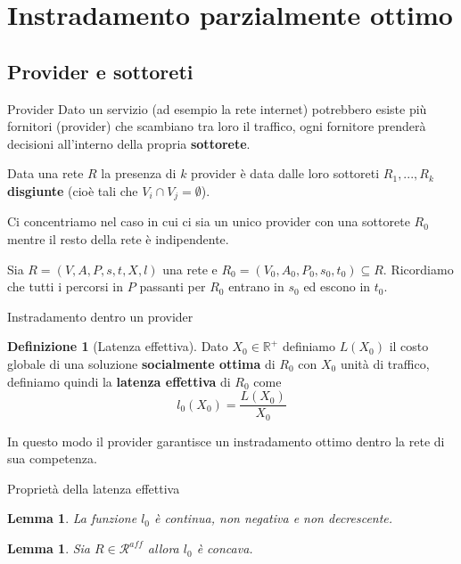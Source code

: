 \documentclass{beamer}
\newcounter{counter1}
\theoremstyle{plain}
\newtheorem{mylem}[counter1]{Lemma}
\theoremstyle{definition}
\newtheorem{mydef}[counter1]{Definizione}
\theoremstyle{remark}
\newcommand{\pa}[1]{\left(#1\right)}
\begin{document}
\section{Instradamento parzialmente ottimo}

\subsection{Provider e sottoreti}

\begin{frame}{Provider}
  Dato un servizio (ad esempio la rete internet) potrebbero esiste più
  fornitori (provider) che scambiano tra loro il traffico, ogni
  fornitore prenderà decisioni all'interno della propria
  \textbf{sottorete}.

  Data una rete $R$ la presenza di $k$ provider è data dalle loro
  sottoreti $R_1,...,R_k$ \textbf{disgiunte} (cioè tali che $V_i\cap
  V_j = \emptyset$). \vfill

  Ci concentriamo nel caso in cui ci sia un unico provider con una
  sottorete $R_0$ mentre il resto della rete è indipendente.

  Sia $R=(V,A,P,s,t,X,l)$ una rete e $R_0=(V_0,A_0,P_0,s_0,t_0)
  \subseteq R$. Ricordiamo che tutti i percorsi in $P$ passanti per
  $R_0$ entrano in $s_0$ ed escono in $t_0$.
  \vfill
\end{frame}

\begin{frame}{Instradamento dentro un provider}
  \begin{mydef}[Latenza effettiva]
    Dato $X_0\in\mathbb{R}^+$ definiamo $L\pa{X_0}$ il costo globale di
    una soluzione \textbf{socialmente ottima} di $R_0$ con $X_0$ unità
    di traffico, definiamo quindi la \textbf{latenza effettiva} di
    $R_0$ come
    \[ l_0(X_0) = \frac{L\pa{X_0}}{X_0} \]
  \end{mydef}
  In questo modo il provider garantisce un instradamento ottimo dentro
  la rete di sua competenza.
\end{frame}
\begin{frame}{Proprietà della latenza effettiva}
  \begin{mylem}
    La funzione $l_0$ è continua, non negativa e non decrescente.
  \end{mylem}
  \begin{mylem}
    Sia $R\in \mathcal{R}^{aff}$ allora $l_0$ è concava.
  \end{mylem}
\end{frame}
\end{document}
